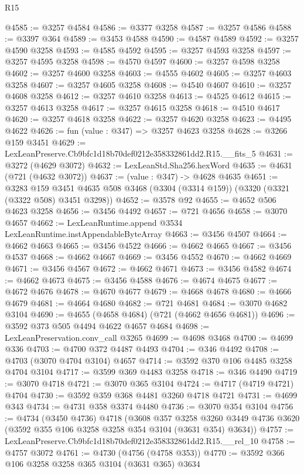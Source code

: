 \begin{lexlean}{R15}
\begin{coremodule}
@4585 := @3257 @4584
@4586 := @3377 @3258
@4587 := @3257 @4586
@4588 := @3397 @364
@4589 := @3453 @4588
@4590 := @4587 @4589
@4592 := @3257 @4590 @3258
@4593 := @4585 @4592
@4595 := @3257 @4593 @3258
@4597 := @3257 @4595 @3258
@4598 := @4570 @4597
@4600 := @3257 @4598 @3258
@4602 := @3257 @4600 @3258
@4603 := @4555 @4602
@4605 := @3257 @4603 @3258
@4607 := @3257 @4605 @3258
@4608 := @4540 @4607
@4610 := @3257 @4608 @3258
@4612 := @3257 @4610 @3258
@4613 := @4525 @4612
@4615 := @3257 @4613 @3258
@4617 := @3257 @4615 @3258
@4618 := @4510 @4617
@4620 := @3257 @4618 @3258
@4622 := @3257 @4620 @3258
@4623 := @4495 @4622
@4626 := fun (value : @347) => @3257 @4623 @3258
@4628 := @3266 @159 @3451
@4629 := LexLeanPreserve.Cb9bfc1d18b70def0212e358332861dd2.R15.__fits_5
@4631 := @3272 (@4629 @3072)
@4632 := LexLeanStd.Sha256.hexWord
@4635 := @4631 (@721 (@4632 @3072))
@4637 := (value : @347) -> @4628 @4635
@4651 := @3283
    @159
    @3451
    @4635
    @508
    @3468
    (@3304 (@3314 @159))
    (@3320 (@3321 (@3322 @508) @3451 @3298))
@4652 := @3578 @92
@4655 := @4652 @506 @4623 @3258
@4656 := @3456 @4492
@4657 := @721 @4656
@4658 := @3070 @4657
@4662 := LexLeanRuntime.append @3534 LexLeanRuntime.instAppendableByteArray
@4663 := @3456 @4507
@4664 := @4662 @4663
@4665 := @3456 @4522
@4666 := @4662 @4665
@4667 := @3456 @4537
@4668 := @4662 @4667
@4669 := @3456 @4552
@4670 := @4662 @4669
@4671 := @3456 @4567
@4672 := @4662 @4671
@4673 := @3456 @4582
@4674 := @4662 @4673
@4675 := @3456 @4588
@4676 := @4674 @4675
@4677 := @4672 @4676
@4678 := @4670 @4677
@4679 := @4668 @4678
@4680 := @4666 @4679
@4681 := @4664 @4680
@4682 := @721 @4681
@4684 := @3070 @4682 @3104
@4690 := @4655 (@4658 @4684) (@721 (@4662 @4656 @4681))
@4696 := @3592 @373 @505 @4494 @4622 @4657 @4684
@4698 := LexLeanPreservation.conv_call @3265
@4699 := @4698 @3468
@4700 := @4699 @336
@4703 := @4700 @372 @4487 @4493
@4704 := @346 @4492
@4708 := @4703 (@3070 @4704 @3104) @4657
@4714 := @3592 @370 @106 @4485 @3258 @4704 @3104
@4717 := @3599 @369 @4483 @3258
@4718 := @346 @4490
@4719 := @3070 @4718
@4721 := @3070 @365 @3104
@4724 := @4717 (@4719 @4721) @4704
@4730 := @3592 @359 @368 @4481 @3260 @4718 @4721
@4731 := @4699 @343
@4734 := @4731 @358 @3374 @4480
@4736 := @3070 @354 @3104
@4756 := @4734
    (@3450 @4736)
    @4718
    (@3608
      @357
      @3258
      @3260
      @3449
      @4736
      @3620
      (@3592 @355 @106 @3258 @3258 @354 @3104 (@3631 @354) @3634))
@4757 := LexLeanPreserve.Cb9bfc1d18b70def0212e358332861dd2.R15.__rel_10
@4758 := @4757 @3072
@4761 := @4730 (@4756 (@4758 @353))
@4770 := @3592 @366 @106 @3258 @3258 @365 @3104 (@3631 @365) @3634

\end{coremodule}
\end{lexlean}
